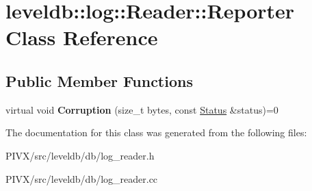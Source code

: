 \hypertarget{classleveldb_1_1log_1_1_reader_1_1_reporter}{}\section{leveldb\+:\+:log\+:\+:Reader\+:\+:Reporter Class Reference}
\label{classleveldb_1_1log_1_1_reader_1_1_reporter}
\subsection*{Public Member Functions}
\begin{DoxyCompactItemize}
\item 
\mbox{\label{classleveldb_1_1log_1_1_reader_1_1_reporter_a2d28d30f9559d5fc9f94af41d239932e}} 
virtual void {\bfseries Corruption} (size\+\_\+t bytes, const \mbox{\hyperlink{classleveldb_1_1_status}{Status}} \&status)=0
\end{DoxyCompactItemize}


The documentation for this class was generated from the following files\+:\begin{DoxyCompactItemize}
\item 
P\+I\+V\+X/src/leveldb/db/log\+\_\+reader.\+h\item 
P\+I\+V\+X/src/leveldb/db/log\+\_\+reader.\+cc\end{DoxyCompactItemize}
